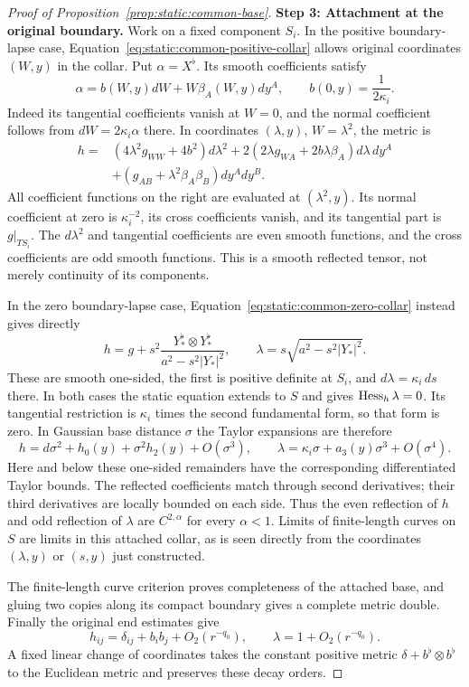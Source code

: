 \begin{proof}[Proof of Proposition~\ref{prop:static:common-base}]
\smallskip\noindent
\textbf{Step 3: Attachment at the original boundary.}
Work on a fixed component $S_i$.  In the positive boundary-lapse
case, Equation~\eqref{eq:static:common-positive-collar}
allows original coordinates $(W,y)$ in the collar.  Put
$\alpha=X^\flat$.  Its smooth coefficients satisfy
\[
 \alpha=b(W,y)dW+W\beta_A(W,y)dy^A,
 \qquad b(0,y)=\frac1{2\kappa_i}.
\]
Indeed its tangential coefficients vanish at $W=0$, and the
normal coefficient follows from $dW=2\kappa_i\alpha$ there.
In coordinates $(\lambda,y)$, $W=\lambda^2$, the metric is
\begin{align*}
 h={}&(4\lambda^2g_{WW}+4b^2)d\lambda^2
 +2(2\lambda g_{WA}+2b\lambda\beta_A)d\lambda\,dy^A\\
 &+(g_{AB}+\lambda^2\beta_A\beta_B)dy^A dy^B.
\end{align*}
All coefficient functions on the right are evaluated at
$(\lambda^2,y)$.  Its normal coefficient at zero is
$\kappa_i^{-2}$, its cross coefficients vanish, and its tangential
part is $g|_{TS_i}$.  The $d\lambda^2$ and tangential coefficients
are even smooth functions, and the cross coefficients are odd
smooth functions.  This is a smooth reflected tensor, not merely
continuity of its components.

In the zero boundary-lapse case,
Equation~\eqref{eq:static:common-zero-collar} instead gives directly
\[
 h=g+s^2\frac{Y_*^\flat\otimes Y_*^\flat}
                    {a^2-s^2|Y_*|^2},\qquad
 \lambda=s\sqrt{a^2-s^2|Y_*|^2}.
\]
These are smooth one-sided, the first is positive definite at
$S_i$, and $d\lambda=\kappa_i\,ds$ there.  In both cases the
static equation extends to $S$ and gives $\operatorname{Hess}_h\lambda=0$.
Its tangential restriction is $\kappa_i$ times the second
fundamental form, so that form is zero.  In Gaussian base
distance $\sigma$ the Taylor expansions are therefore
\begin{equation}\label{eq:static:polar-jets}
 h=d\sigma^2+h_0(y)+\sigma^2h_2(y)+O(\sigma^3),\qquad
 \lambda=\kappa_i\sigma+a_3(y)\sigma^3+O(\sigma^4).
\end{equation}
Here and below these one-sided remainders have the corresponding
differentiated Taylor bounds.  The reflected coefficients match
through second derivatives; their third derivatives are locally
bounded on each side.  Thus the even reflection of $h$ and odd
reflection of $\lambda$ are $C^{2,\alpha}$ for every $\alpha<1$.
Limits of finite-length curves on $S$
are limits in this attached collar, as is seen directly from
the coordinates $(\lambda,y)$ or $(s,y)$ just constructed.

The finite-length curve criterion proves completeness of the
attached base, and gluing two copies along its compact boundary
gives a complete metric double.  Finally the original end estimates
give
\[
 h_{ij}=\delta_{ij}+b_i b_j+O_2(r^{-q_0}),\qquad
 \lambda=1+O_2(r^{-q_0}).
\]
A fixed linear change of coordinates takes the constant positive
metric $\delta+b^\flat\otimes b^\flat$ to the Euclidean metric
and preserves these decay orders.
\end{proof}


